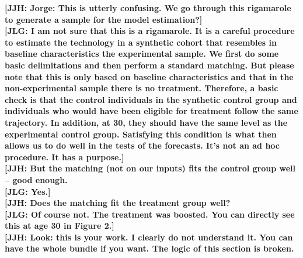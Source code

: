 \noindent \textbf{[JJH: Jorge: This is utterly confusing. We go through this rigamarole to generate a sample for the model estimation?]}\\ 

\noindent \textbf{[JLG: I am not sure that this is a rigamarole. It is a careful procedure to estimate the technology in a synthetic cohort that resembles in baseline characteristics the experimental sample. We first do some basic delimitations and then perform a standard matching. But please note that this is only based on baseline characteristics and that in the non-experimental sample there is no treatment. Therefore, a basic check is that the control individuals in the synthetic control group and individuals who would have been eligible for treatment follow the same trajectory. In addition, at 30, they should have the same level as the experimental control group. Satisfying this condition is what then allows us to do well in the tests of the forecasts. It's not an ad hoc procedure. It has a purpose.]}\\ 

\noindent \textbf{[JJH: But the matching (not on our inputs) fits the control group well -- good enough.}\\ 
\noindent \textbf{[JLG: Yes.]}\\

\noindent \textbf{[JJH: Does the matching fit the treatment group well?}\\ 
\noindent \textbf{[JLG: Of course not. The treatment was boosted. You can directly see this at age 30 in Figure 2.]}\\

\noindent \textbf{[JJH: Look: this is your work. I clearly do not understand it. You can have the whole bundle if you want. The logic of this section is broken.}\\

